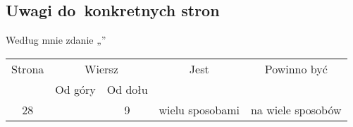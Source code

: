 \documentclass[a4paper,11pt]{article}
\numberwithin{equation}{section}
\begin{document}
\label{sec:Feller-Wstep-do-rachunku-ETC}



\subsection{Uwagi do~konkretnych stron}

\label{subsec:Uwagi-do-konkretnych-stron}



\noindent
{} Według mnie zdanie „”





\begin{center}

  \begin{tabular}{|c|c|c|c|c|}
    \hline
    Strona & \multicolumn{2}{c|}{Wiersz} & Jest
                              & Powinno być \\ \cline{2-3}
    & Od góry & Od dołu & & \\
    \hline
    28  & &  9 & wielu sposobami & na wiele sposobów \\
    \hline
  \end{tabular}

\end{center}

\VerSpaceSix
















{}






\end{document}
